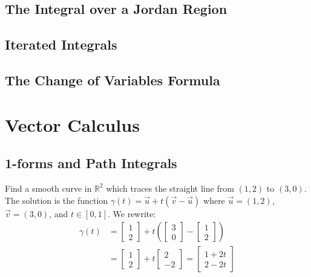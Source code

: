 \documentclass[12pt]{book}
\newcommand{\R}{\mathbb{R}}
\newenvironment{exercise}[2][Exercise]{\begin{trivlist}
\item[\hskip \labelsep {\bfseries #1}\hskip \labelsep {\bfseries #2.}]}{\end{trivlist}}
\begin{document}
\section{The Integral over a Jordan Region}


\section{Iterated Integrals}

\section{The Change of Variables Formula}




\chapter{Vector Calculus}
\section{1-forms and Path Integrals}

\begin{exercise}{11.1.1}
    Find a smooth curve in $\R^2$ which traces the straight line from $(1,2)$ to $(3,0)$.\\

    The solution is the function $\gamma(t) = \vec{u} + t(\vec{v}-\vec{u})$ where $\vec{u}=(1,2)$, $\vec{v}=(3,0)$, and $t \in [0,1]$. We rewrite:
    \begin{align*}
    \gamma(t) &= \begin{bmatrix} 1 \\ 2 \end{bmatrix} + t \left(\begin{bmatrix} 3 \\ 0 \end{bmatrix}- \begin{bmatrix} 1 \\ 2 \end{bmatrix} \right) \\
              &= \begin{bmatrix} 1 \\ 2 \end{bmatrix} + t \begin{bmatrix} 2 \\ -2 \end{bmatrix} = \begin{bmatrix} 1 + 2 t\\ 2 - 2 t \end{bmatrix}
    \end{align*}
\end{exercise}
\end{document}
